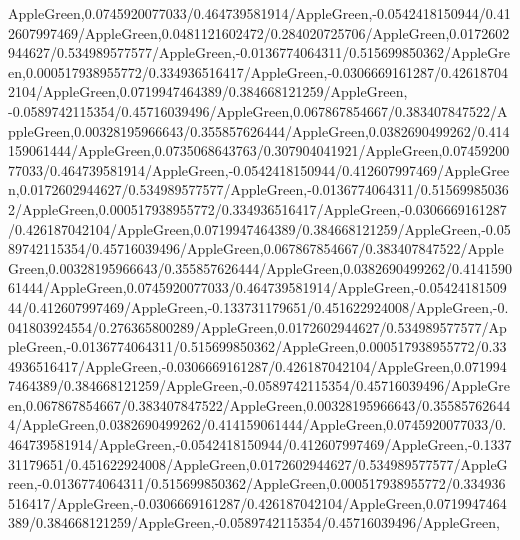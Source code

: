 {\begin{tikzternal}
{AppleGreen,0.0745920077033/0.464739581914/AppleGreen,-0.0542418150944/0.412607997469/AppleGreen,0.0481121602472/0.284020725706/AppleGreen,0.0172602944627/0.534989577577/AppleGreen,-0.0136774064311/0.515699850362/AppleGreen,0.000517938955772/0.334936516417/AppleGreen,-0.0306669161287/0.426187042104/AppleGreen,0.0719947464389/0.384668121259/AppleGreen,
-0.0589742115354/0.45716039496/AppleGreen,0.067867854667/0.383407847522/AppleGreen,0.00328195966643/0.355857626444/AppleGreen,0.0382690499262/0.414159061444/AppleGreen,0.0735068643763/0.307904041921/AppleGreen,0.0745920077033/0.464739581914/AppleGreen,-0.0542418150944/0.412607997469/AppleGreen,0.0172602944627/0.534989577577/AppleGreen,-0.0136774064311/0.515699850362/AppleGreen,0.000517938955772/0.334936516417/AppleGreen,-0.0306669161287/0.426187042104/AppleGreen,0.0719947464389/0.384668121259/AppleGreen,-0.0589742115354/0.45716039496/AppleGreen,0.067867854667/0.383407847522/AppleGreen,0.00328195966643/0.355857626444/AppleGreen,0.0382690499262/0.414159061444/AppleGreen,0.0745920077033/0.464739581914/AppleGreen,-0.0542418150944/0.412607997469/AppleGreen,-0.133731179651/0.451622924008/AppleGreen,-0.041803924554/0.276365800289/AppleGreen,0.0172602944627/0.534989577577/AppleGreen,-0.0136774064311/0.515699850362/AppleGreen,0.000517938955772/0.334936516417/AppleGreen,-0.0306669161287/0.426187042104/AppleGreen,0.0719947464389/0.384668121259/AppleGreen,-0.0589742115354/0.45716039496/AppleGreen,0.067867854667/0.383407847522/AppleGreen,0.00328195966643/0.355857626444/AppleGreen,0.0382690499262/0.414159061444/AppleGreen,0.0745920077033/0.464739581914/AppleGreen,-0.0542418150944/0.412607997469/AppleGreen,-0.133731179651/0.451622924008/AppleGreen,0.0172602944627/0.534989577577/AppleGreen,-0.0136774064311/0.515699850362/AppleGreen,0.000517938955772/0.334936516417/AppleGreen,-0.0306669161287/0.426187042104/AppleGreen,0.0719947464389/0.384668121259/AppleGreen,-0.0589742115354/0.45716039496/AppleGreen,
}
\end{tikzternal}}
